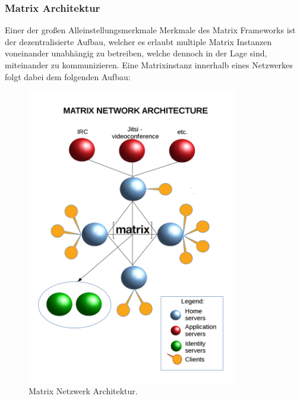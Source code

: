 \subsubsection{Matrix Architektur}\label{chapter:aemn}
Einer der großen Alleinstellungsmerkmale Merkmale des Matrix Frameworks ist der dezentralisierte Aufbau, welcher es erlaubt multiple Matrix Instanzen voneinander unabhängig zu betreiben, welche dennoch in der Lage sind, miteinander zu kommunizieren. Eine Matrixinstanz innerhalb eines Netzwerkes folgt dabei dem folgenden Aufbau:

\begin{figure}[htb]
    \centering
    \includegraphics[height=13cm]{graphics/1280px-Diagramme_Matrix_en.png}
    \caption[Matrix Netzwerk Architektur]{Matrix Netzwerk Architektur.\footnotemark}
    \label{abb:DHBWLogo}
\end{figure}

